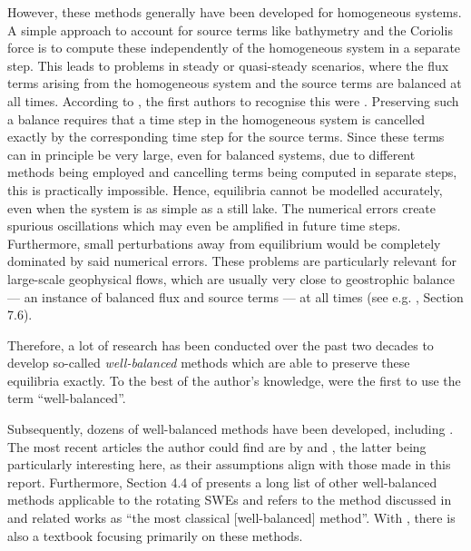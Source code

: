 However, these methods generally have been developed for homogeneous systems. A simple approach to account for source terms like bathymetry and the Coriolis force is to compute these independently of the homogeneous system in a separate step. This leads to problems in steady or quasi-steady scenarios, where the flux terms arising from the homogeneous system and the source terms are balanced at all times. According to \citet{toro2007godunov}, the first authors to recognise this were \citet{glimm1984generalized}. Preserving such a balance requires that a time step in the homogeneous system is  cancelled exactly by the corresponding time step for the source terms. Since these terms can in principle be very large, even for balanced systems, due to different methods being employed and cancelling terms being computed in separate steps, this is practically impossible. Hence, equilibria cannot be modelled accurately, even when the system is as simple as a still lake. The numerical errors create spurious oscillations which may even be amplified in future time steps. Furthermore, small perturbations away from equilibrium would be completely dominated by said numerical errors. These problems are particularly relevant for large-scale geophysical flows, which are usually very close to geostrophic balance --- an instance of balanced flux and source terms --- at all times (see e.g. \cite{gill1982atmosphere}, Section 7.6).

Therefore, a lot of research has been conducted over the past two decades to develop so-called \emph{well-balanced} methods which are able to preserve these equilibria exactly. To the best of the author's knowledge, \citet{greenberg1996well} were the first to use the term ``well-balanced''.

Subsequently, dozens of well-balanced methods have been developed, including \cite{leveque1998balancing,garcia2000numerical,hubbard2000flux,burguete2001efficient,gascon2001construction,rogers2001adaptive,bale2003wave,rogers2003mathematical,audusse2004fast,chinnayya2004well,liang2009adaptive,liang2009numerical}. The most recent articles the author could find are by \citet{zhang2014well} and \citet{chertockwell}, the latter being particularly interesting here, as their assumptions align with those made in this report. Furthermore, Section 4.4 of \cite{zeitlin2007nonlinear} presents a long list of other well-balanced methods applicable to the rotating SWEs and refers to the method discussed in \cite{audusse2004fast} and related works as ``the most classical [well-balanced] method''. With \cite{bouchut2004nonlinear}, there is also a textbook focusing primarily on these methods.

